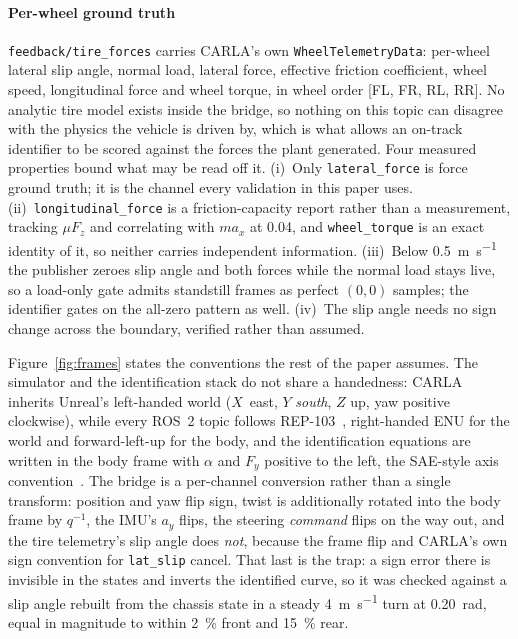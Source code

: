 \paragraph{Per-wheel ground truth}
\texttt{feedback/\allowbreak tire\_forces} carries CARLA's own
\texttt{Wheel\-TelemetryData}: per-wheel lateral slip angle, normal load,
lateral force, effective friction coefficient, wheel speed, longitudinal force
and wheel torque, in wheel order [FL, FR, RL, RR]. No analytic tire model
exists inside the bridge, so nothing on this topic can disagree with the
physics the vehicle is driven by, which is what allows an on-track identifier
to be scored against the forces the plant generated. Four measured properties
bound what may be read off it. (i)~Only \texttt{lateral\_force} is force ground
truth; it is the channel every validation in this paper uses.
(ii)~\texttt{longitudinal\_force} is a friction-capacity report rather than a
measurement, tracking $\mu F_{z}$ and correlating with $ma_{x}$ at \num{0.04},
and \texttt{wheel\_torque} is an exact identity of it, so neither carries
independent information. (iii)~Below \SI{0.5}{\meter\per\second} the publisher
zeroes slip angle and both forces while the normal load stays live, so a
load-only gate admits standstill frames as perfect $(0,0)$ samples; the
identifier gates on the all-zero pattern as well. (iv)~The slip angle needs no
sign change across the boundary, verified rather than assumed.

Figure~\ref{fig:frames} states the conventions the rest of the paper assumes.
The simulator and the identification stack do not share a handedness: CARLA
inherits Unreal's left-handed world (\mbox{$X$ east}, $Y$ \emph{south}, $Z$ up,
yaw positive clockwise), while every ROS~2 topic follows
REP-103~\cite{rep103}, right-handed ENU for the world and forward-left-up for
the body, and the identification equations are written in the body frame with
$\alpha$ and $F_{y}$ positive to the left, the SAE-style axis
convention~\cite{saej670,pacejka2012book}. The bridge is a per-channel
conversion rather than a single transform: position and yaw flip sign, twist is
additionally rotated into the body frame by $q^{-1}$, the IMU's $a_{y}$ flips,
the steering \emph{command} flips on the way out, and the tire telemetry's slip
angle does \emph{not}, because the frame flip and CARLA's own sign convention
for \texttt{lat\_slip} cancel. That last is the trap: a sign error there is
invisible in the states and inverts the identified curve, so it was checked
against a slip angle rebuilt from the chassis state in a steady
\SI{4}{\meter\per\second} turn at \SI{0.20}{\radian}, equal in magnitude to
within \SI{2}{\percent} front and \SI{15}{\percent} rear.

